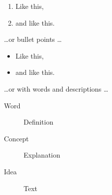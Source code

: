 \documentclass[a4paper]{article}
\begin{document}
\begin{enumerate}
\item Like this,
\item and like this.
\end{enumerate}
\dots or bullet points \dots
\begin{itemize}
\item Like this,
\item and like this.
\end{itemize}
\dots or with words and descriptions \dots
\begin{description}
\item[Word] Definition
\item[Concept] Explanation
\item[Idea] Text
\end{description}
\end{document}
